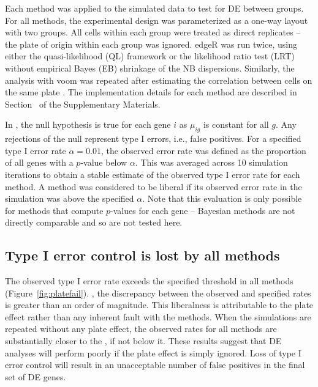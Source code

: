 \documentclass[oupdraft]{bio}
\begin{document}
Each method was applied to the simulated data to test for DE between groups. 
For all methods, the experimental design was parameterized as a one-way layout with two groups.
All cells within each group were treated as direct replicates -- the plate of origin within each group was ignored.
edgeR was run twice, using either the quasi-likelihood (QL) framework \citep{lund2012detecting} 
    or the likelihood ratio test (LRT) \citep{mccarthy2012differential} without empirical Bayes (EB) shrinkage of the NB dispersions.
Similarly, the analysis with voom was repeated after estimating the correlation between cells on the same plate \citep{smyth2005use}.
The implementation details for each method are described in Section~\suppimplementation{} of the Supplementary Materials.

In , the null hypothesis is true for each gene $i$ as $\mu_{ig}$ is constant for all $g$.
Any rejections of the null represent type I errors, i.e., false positives.
For a specified type I error rate $\alpha = 0.01$, the observed error rate was defined as the proportion of all genes with a $p$-value below $\alpha$.
This was averaged across 10 simulation iterations to obtain a stable estimate of the observed type I error rate for each method. 
A method was considered to be liberal if its observed error rate in the simulation was above the specified $\alpha$.
Note that this evaluation is only possible for methods that compute $p$-values for each gene -- 
    Bayesian methods \citep{vallejos2016beyond,kharchenko2014bayesian} are not directly comparable and so are not tested here.


\subsection{Type I error control is lost by all methods}
The observed type I error rate exceeds the specified threshold in all methods (Figure~\ref{fig:platefail}).
, the discrepancy between the observed and specified rates is greater than an order of magnitude.
This liberalness is attributable to the plate effect rather than any inherent fault with the methods.
When the simulations are repeated without any plate effect, the observed rates for all methods are substantially closer to the , if not below it.
These results suggest that DE analyses will perform poorly if the plate effect is simply ignored.
Loss of type I error control will result in an unacceptable number of false positives in the final set of DE genes.
\end{document}
